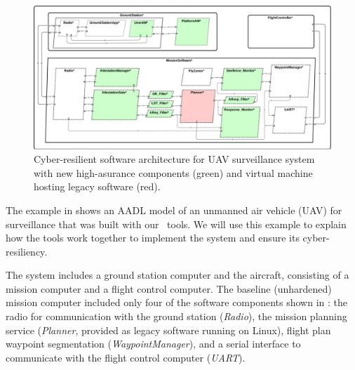 \begin{figure}
	\begin{center}
	  \includegraphics[width=\textwidth]{./figs/sw-hardened.png}
  \end{center}
	\caption{Cyber-resilient software architecture for UAV surveillance system 
	with new high-asurance components (green) and virtual machine hosting legacy software (red).} 
	\label{fig:sw-hardened} 
\end{figure}

The example in  shows an AADL model
of an unmanned air vehicle (UAV) for surveillance that was built with our \briefcase \ tools.  
We will use this example to explain how the tools work together to implement the system
and ensure its cyber-resiliency.  

The system includes a ground station computer and the aircraft, consisting of a mission computer and 
a flight control computer.  
The baseline (unhardened) mission computer included only four of the software components shown in : 
the radio for communication with the ground station (\emph{Radio}), 
the mission planning service (\emph{Planner}, provided as legacy software running on Linux), 
flight plan waypoint segmentation (\emph{WaypointManager}), 
and a serial interface to communicate with the flight control computer (\emph{UART}).

